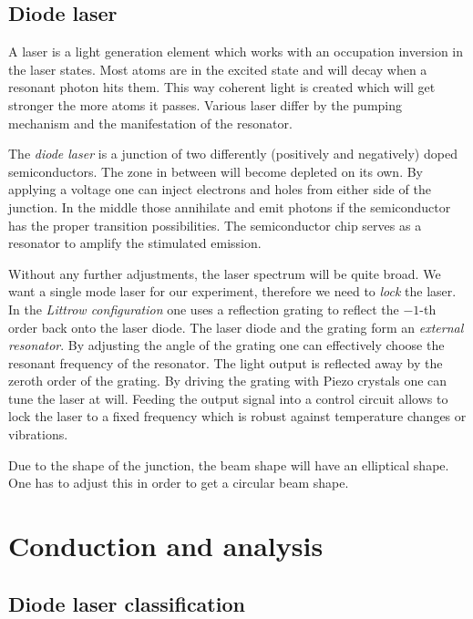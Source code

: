 \documentclass[11pt, english, fleqn, DIV=15, headinclude, BCOR=2cm]{scrreprt}
\begin{document}

\section{Diode laser}
\label{sec:diode_laser}

A laser is a light generation element which works with an occupation inversion
in the laser states. Most atoms are in the excited state and will decay when a
resonant photon hits them. This way coherent light is created which will get
stronger the more atoms it passes. Various laser differ by the pumping
mechanism and the manifestation of the resonator.

The \emph{diode laser} is a junction of two differently (positively and
negatively) doped semiconductors. The zone in between will become depleted on
its own. By applying a voltage one can inject electrons and holes from either
side of the junction. In the middle those annihilate and emit photons if the
semiconductor has the proper transition possibilities. The semiconductor chip
serves as a resonator to amplify the stimulated emission.

Without any further adjustments, the laser spectrum will be quite broad. We
want a single mode laser for our experiment, therefore we need to \emph{lock}
the laser. In the \emph{Littrow configuration} one uses a reflection grating to
reflect the $-1$-th order back onto the laser diode. The laser diode and the
grating form an \emph{external resonator}. By adjusting the angle of the
grating one can effectively choose the resonant frequency of the resonator. The
light output is reflected away by the zeroth order of the grating. By driving
the grating with Piezo crystals one can tune the laser at will. Feeding the
output signal into a control circuit allows to lock the laser to a fixed
frequency which is robust against temperature changes or vibrations.

Due to the shape of the junction, the beam shape will have an elliptical shape.
One has to adjust this in order to get a circular beam shape.

\chapter{Conduction and analysis}

\section{Diode laser classification}
\end{document}

